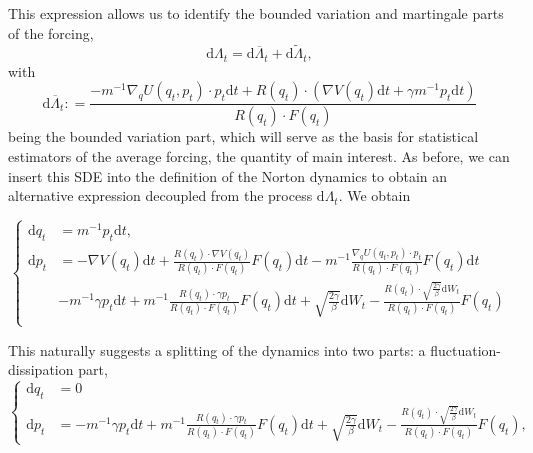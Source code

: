 \documentclass[a4paper,10pt,twoside,leqno]{report}
\newcommand{\dif}{\mathrm{d}}
\newcommand{\defeq}{\mathrel{\mathop:}=}
\newcommand{\1}{\mathbbm{1}}
\begin{document}
    This expression allows us to identify the bounded variation and martingale parts of the forcing, 
    \begin{equation}
        \dif \Lambda_t=\dif \overline{\Lambda}_t+\dif \widetilde{\Lambda}_t,
    \end{equation}
    with 
    \begin{equation}
        \label{eq:norton_sv_forcing_bv_part}
        \dif \overline{\Lambda}_t\defeq \frac{-m^{-1}\nabla_q U(q_t,p_t)\cdot p_t \dif t+R(q_t)\cdot\left(\nabla V(q_t)\dif t+\gamma m^{-1}p_t\dif t\right)}{R(q_t)\cdot F(q_t)}
    \end{equation}
    being the bounded variation part, which will serve as the basis for statistical estimators of the average forcing, the quantity of main interest.
    As before, we can insert this SDE into the definition of the Norton dynamics to obtain
    an alternative expression decoupled from the process $\dif \Lambda_t$. We obtain
    
    \begin{equation}
        \label{eq:norton_sv_dynamics_solved}
        \left\{
            \begin{aligned}
                \dif q_t &= m^{-1}p_t\dif t,\\
                \dif p_t &= -\nabla V(q_t)\dif t +\frac{R(q_t)\cdot \nabla V(q_t)}{R(q_t)\cdot F(q_t)}F(q_t)\dif t-m^{-1}\frac{\nabla_q U(q_t,p_t)\cdot p_t}{R(q_t)\cdot F(q_t)}F(q_t)\dif t\\
                &-m^{-1}\gamma p_t\dif t+m^{-1}\frac{R(q_t)\cdot \gamma p_t}{R(q_t)\cdot F(q_t)}F(q_t)\dif t+\sqrt{\frac{2\gamma}{\beta}}\dif W_t-\frac{R(q_t)\cdot \sqrt{\frac{2\gamma}{\beta}}\dif W_t}{R(q_t)\cdot F(q_t)}F(q_t)\\
                    \end{aligned}
        \right.
    \end{equation}
    
    This naturally suggests a splitting of the dynamics into two parts: a fluctuation-dissipation part,
    \begin{equation}
        \label{eq:norton_sv_fd_part}
        \left\{\begin{aligned}
            \dif q_t&=0\\
            \dif p_t&=-m^{-1}\gamma p_t\dif t+m^{-1}\frac{R(q_t)\cdot \gamma p_t}{R(q_t)\cdot F(q_t)}F(q_t)\dif t+\sqrt{\frac{2\gamma}{\beta}}\dif W_t-\frac{R(q_t)\cdot \sqrt{\frac{2\gamma}{\beta}}\dif W_t}{R(q_t)\cdot F(q_t)}F(q_t),
        \end{aligned}\right.
    \end{equation}
    
\end{document}
